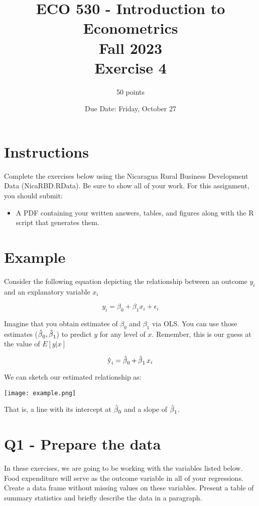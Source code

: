 \documentclass[12pt]{article}		%
\title{ECO 530 - Introduction to Econometrics \\ Fall 2023 \\Exercise 4}
\author{50 points}
\date{Due Date: Friday, October 27 }
\begin{document}
\maketitle

\section*{Instructions}
Complete the exercises below using the Nicaragua Rural Business Development Data (NicaRBD.RData). Be sure to show all of your work. For this assignment, you should submit:
\begin{itemize}
	\item A PDF containing your written answers, tables, and figures along with the R script that generates them.
\end{itemize}


\clearpage

\section*{Example}

Consider the following equation depicting the relationship between an outcome $y_i$ and an explanatory variable $x_i$

$$ y_i = \beta_0 + \beta_1 x_i + \epsilon_i$$

Imagine that you obtain estimates of $\beta_0$ and $\beta_1$ via OLS. You can use those estimates ($\operatorname{\hat{\beta}}_0,\operatorname{\hat{\beta}}_1$) to predict $y$ for any level of $x$. Remember, this is our guess at the value of $E[y|x]$

$$ \operatorname{\hat{y}}_i = \operatorname{\hat{\beta}}_0 + \operatorname{\hat{\beta}}_1 x_i $$

We can sketch our estimated relationship as:

\begin{center}
	\texttt{[image: example.png]}
\end{center}

That is, a line with its intercept at $\operatorname{\hat{\beta}}_0$ and a slope of $\operatorname{\hat{\beta}}_1$. 

\clearpage


\section*{Q1 - Prepare the data}

In these exercises, we are going to be working with the variables listed below. Food expenditure will serve as the outcome variable in all of your regressions. Create a data frame without missing values on these variables. Present a table of summary statistics and briefly describe the data in a paragraph.
\end{document}
